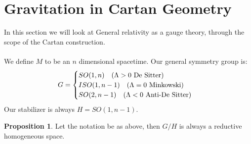 \documentclass[12pt,a4paper]{report}
\theoremstyle{definition}
\theoremstyle{Theorem}
\newtheorem{Prop}[Def]{Proposition}
\theoremstyle{definition}
\theoremstyle{definition}
\begin{document}
	\section{Gravitation in Cartan Geometry}
	In this section we will look at General relativity as a gauge theory, through the scope of the Cartan construction.
	\\\\
	We define $M$ to be an $n$ dimensional spacetime. Our general symmetry group is:
	$$G=\begin{cases}
		SO(1,n) \hspace{10 pt}(\Lambda>0 \hbox{ De Sitter})\\
		ISO(1,n-1)\hspace{10 pt} (\Lambda=0 \hbox{ Minkowski})\\
		SO(2,n-1)\hspace{10 pt} (\Lambda<0 \hbox{ Anti-De Sitter})
	\end{cases}$$
	Our stabilizer is always $H=SO(1,n-1)$.
	\begin{Prop}
		Let the notation be as above, then $G/H$ is always a reductive homogeneous space.
	\end{Prop}
\end{document}
